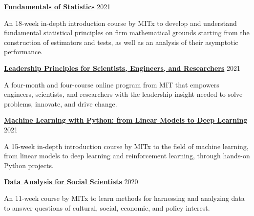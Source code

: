 \documentclass[margin,line]{res}
\begin{document}
\begin{resume}
{\bf \href{https://www.edx.org/course/fundamentals-of-statistics}{Fundamentals of Statistics}} \hfill {2021}\\
\vspace*{-3.5mm}
\begin{addmargin}[0pt]{.1\linewidth}
\vspace*{-1mm}
An 18-week in-depth introduction course by MITx to develop and understand fundamental statistical principles on firm mathematical grounds starting from the construction of estimators and tests, as well as an analysis of their asymptotic performance.
\end{addmargin}

\vspace*{-2mm}

{\bf \href{https://xpro.mit.edu/programs/program-v1:xPRO+LASERx/}{Leadership Principles for Scientists, Engineers, and Researchers}} \hfill {2021}\\
\vspace*{-3.5mm}
\begin{addmargin}[0pt]{.1\linewidth}
\vspace*{-1mm}
A four-month and four-course online program from MIT that empowers engineers, scientists, and researchers with the leadership insight needed to solve problems, innovate, and drive change.
\end{addmargin}

\vspace*{-2mm}

{\bf \href{https://www.edx.org/course/machine-learning-with-python-from-linear-models-to}{Machine Learning with Python: from Linear Models to Deep Learning}} \hfill {2021}\\
\vspace*{-3.5mm}
\begin{addmargin}[0pt]{.1\linewidth}
\vspace*{-1mm}
A 15-week in-depth introduction course by MITx to the field of machine learning, from linear models to deep learning and reinforcement learning, through hands-on Python projects.
\end{addmargin}

\vspace*{-2mm}

{\bf \href{https://mitxonline.mit.edu/courses/course-v1:MITxT+14.310x/}{Data Analysis for Social Scientists}} \hfill {2020}\\
\vspace*{-3.5mm}
\begin{addmargin}[0pt]{.1\linewidth}
\vspace*{-1mm}
An 11-week course by MITx to learn methods for harnessing and analyzing data to answer questions of cultural, social, economic, and policy interest.
\end{addmargin}


\end{resume}
\end{document}
